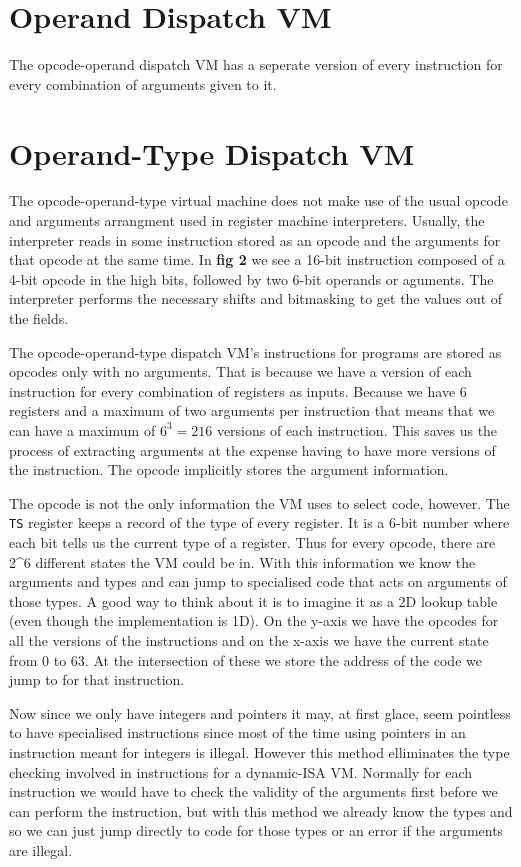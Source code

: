 \documentclass[english,a4paper]{report}
\begin{document}
\section{Operand Dispatch VM}

The opcode-operand dispatch VM has a seperate version of every
instruction for every combination of arguments given to it.

\section{Operand-Type Dispatch VM}

The opcode-operand-type virtual machine does not make use of the usual
opcode and arguments arrangment used in register machine
interpreters. Usually, the interpreter reads in some instruction
stored as an opcode and the arguments for that opcode at the same
time. In \textbf{fig 2} we see a 16-bit instruction composed of a 4-bit
opcode in the high bits, followed by two 6-bit operands or
aguments. The interpreter performs the necessary shifts and bitmasking
to get the values out of the fields.

The opcode-operand-type dispatch VM's instructions for programs are
stored as opcodes only with no arguments. That is because we have a
version of each instruction for every combination of registers as
inputs. Because we have 6 registers and a maximum of two arguments per
instruction that means that we can have a maximum of $6^3 = 216$
versions of each instruction. This saves us the process of extracting
arguments at the expense having to have more versions of the
instruction. The opcode implicitly stores the argument information.

The opcode is not the only information the VM uses to select code,
however. The \verb|TS| register keeps a record of the type of every
register. It is a 6-bit number where each bit tells us the current
type of a register. Thus for every opcode, there are
2\textasciicircum{}6 different states the VM could be in. With this
information we know the arguments and types and can jump to
specialised code that acts on arguments of those types. A good way to
think about it is to imagine it as a 2D lookup table (even though the
implementation is 1D). On the y-axis we have the opcodes for all the
versions of the instructions and on the x-axis we have the current
state from 0 to 63. At the intersection of these we store the address
of the code we jump to for that instruction.

Now since we only have integers and pointers it may, at first glace,
seem pointless to have specialised instructions since most of the time
using pointers in an instruction meant for integers is
illegal. However this method elliminates the type checking involved in
instructions for a dynamic-ISA VM. Normally for each instruction we
would have to check the validity of the arguments first before we can
perform the instruction, but with this method we already know the
types and so we can just jump directly to code for those types or an
error if the arguments are illegal.
\end{document}
